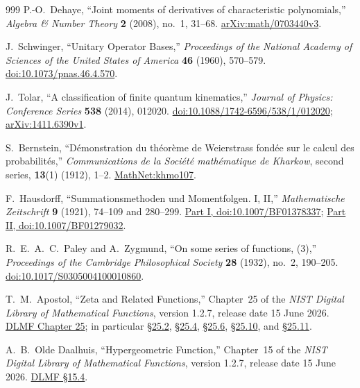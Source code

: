 \begin{thebibliography}{999}
P.-O.~Dehaye,
\textquotedblleft{}Joint moments of derivatives of characteristic polynomials,''
\emph{Algebra \& Number Theory} \textbf{2} (2008), no.~1, 31--68.
\href{https://arxiv.org/abs/math/0703440v3}{arXiv:math/0703440v3}.

J.~Schwinger,
\textquotedblleft{}Unitary Operator Bases,''
\emph{Proceedings of the National Academy of Sciences of the United States of America}
\textbf{46} (1960), 570--579.
\href{https://doi.org/10.1073/pnas.46.4.570}{doi:10.1073/pnas.46.4.570}.

J.~Tolar,
\textquotedblleft{}A classification of finite quantum kinematics,''
\emph{Journal of Physics: Conference Series} \textbf{538} (2014), 012020.
\href{https://doi.org/10.1088/1742-6596/538/1/012020}{doi:10.1088/1742-6596/538/1/012020};
\href{https://arxiv.org/abs/1411.6390v1}{arXiv:1411.6390v1}.

S.~Bernstein,
\textquotedblleft{}Démonstration du théorème de Weierstrass fondée sur le calcul des
probabilités,''
\emph{Communications de la Société mathématique de Kharkow}, second series,
\textbf{13}(1) (1912), 1--2.
\href{https://www.mathnet.ru/eng/khmo107}{MathNet:khmo107}.

F.~Hausdorff,
\textquotedblleft{}Summationsmethoden und Momentfolgen. I, II,''
\emph{Mathematische Zeitschrift} \textbf{9} (1921), 74--109 and 280--299.
\href{https://doi.org/10.1007/BF01378337}{Part I, doi:10.1007/BF01378337};
\href{https://doi.org/10.1007/BF01279032}{Part II, doi:10.1007/BF01279032}.

R.~E.~A.~C.~Paley and A.~Zygmund,
\textquotedblleft{}On some series of functions, (3),''
\emph{Proceedings of the Cambridge Philosophical Society} \textbf{28} (1932), no.~2,
190--205.
\href{https://doi.org/10.1017/S0305004100010860}{doi:10.1017/S0305004100010860}.

T.~M.~Apostol,
\textquotedblleft{}Zeta and Related Functions,''
Chapter~25 of the \emph{NIST Digital Library of Mathematical Functions},
version 1.2.7, release date 15 June 2026.
\href{https://dlmf.nist.gov/25}{DLMF Chapter 25}; in particular
\href{https://dlmf.nist.gov/25.2}{\S25.2},
\href{https://dlmf.nist.gov/25.4}{\S25.4},
\href{https://dlmf.nist.gov/25.6}{\S25.6},
\href{https://dlmf.nist.gov/25.10}{\S25.10}, and
\href{https://dlmf.nist.gov/25.11}{\S25.11}.

A.~B.~Olde Daalhuis,
\textquotedblleft{}Hypergeometric Function,''
Chapter~15 of the \emph{NIST Digital Library of Mathematical Functions},
version 1.2.7, release date 15 June 2026.
\href{https://dlmf.nist.gov/15.4}{DLMF \S15.4}.


\end{thebibliography}

